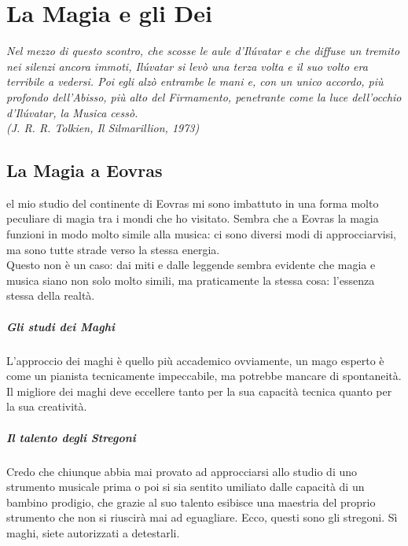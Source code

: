 \chapter{La Magia e gli Dei}

\begin{DndReadAloud}
    \it
    Nel mezzo di questo scontro, che scosse le aule d'Ilúvatar e che diffuse un tremito nei silenzi ancora immoti, Ilúvatar si levò una terza volta e il suo volto era terribile a vedersi. Poi egli alzò entrambe le mani e, con un unico accordo, più profondo dell'Abisso, più alto del Firmamento, penetrante come la luce dell'occhio d'Ilúvatar, la Musica cessò. \\ (J. R. R. Tolkien, Il Silmarillion, 1973)
\end{DndReadAloud}

\section{La Magia a Eovras}

el mio studio del continente di Eovras mi sono imbattuto in una forma molto peculiare di magia tra i mondi che ho visitato. Sembra che a Eovras la magia funzioni in modo molto simile alla musica: ci sono diversi modi di approcciarvisi, ma sono tutte strade verso la stessa energia. \\ Questo non è un caso: dai miti e dalle leggende sembra evidente che magia e musica siano non solo molto simili, ma praticamente la stessa cosa: l'essenza stessa della realtà.

\paragraph{Gli studi dei Maghi}L'approccio dei maghi è quello più accademico ovviamente, un mago esperto è come un pianista tecnicamente impeccabile, ma potrebbe mancare di spontaneità. Il migliore dei maghi deve eccellere tanto per la sua capacità tecnica quanto per la sua creatività.
\paragraph{Il talento degli Stregoni}Credo che chiunque abbia mai provato ad approcciarsi allo studio di uno strumento musicale prima o poi si sia sentito umiliato dalle capacità di un bambino prodigio, che grazie al suo talento esibisce una maestria del proprio strumento che non si riuscirà mai ad eguagliare. Ecco, questi sono gli stregoni. Sì maghi, siete autorizzati a detestarli.
